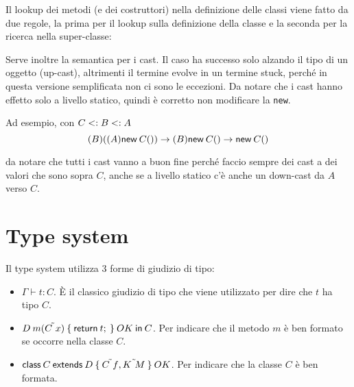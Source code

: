 \noindent Il lookup dei metodi (e dei costruttori) nella definizione delle classi viene fatto da due regole, la prima per il lookup sulla definizione della classe e la seconda per la ricerca nella super-classe:

\begin{prooftree}
\end{prooftree}

\begin{prooftree}
\end{prooftree}

\noindent Serve inoltre la semantica per i cast. Il caso ha successo solo alzando il tipo di un oggetto (up-cast), altrimenti il termine evolve in un termine stuck, perché in questa versione semplificata non ci sono le eccezioni. Da notare che i cast hanno effetto solo a livello statico, quindi è corretto non modificare la \texttt{new}.

\begin{center}
\begin{bprooftree}
\end{bprooftree}
\begin{bprooftree}
\end{bprooftree}
\end{center}

\noindent Ad esempio, con $C \stype B \stype A$
$$
(B)((A) \new{C}{}) \to (B) \new{C}{} \to \new{C}{}
$$

\noindent da notare che tutti i cast vanno a buon fine perché faccio sempre dei cast a dei valori che sono sopra $C$, anche se a livello statico c'è anche un down-cast da $A$ verso $C$.

\section{Type system}

Il type system utilizza 3 forme di giudizio di tipo:

\begin{itemize}
	\item $\Gamma \vdash t : C$. \`E il classico giudizio di tipo che viene utilizzato per dire che $t$ ha tipo $C$.
	\item $\method{D}{m}{\tilde{C\ x}}{t} \: OK \: \IN{C}$. Per indicare che il metodo $m$ è ben formato se occorre nella classe $C$.
	\item $ \class{C}{D}{\tilde{C\ f}, \tilde{K \ M}} \: OK$. Per indicare che la classe $C$ è ben formata.
\end{itemize}

